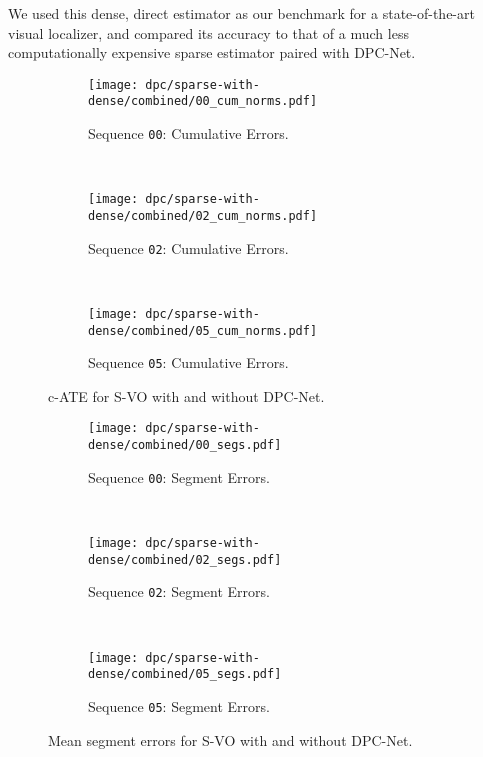 We used this dense, direct estimator as our benchmark for a state-of-the-art visual localizer, and compared its accuracy to that of a much less computationally expensive sparse estimator paired with DPC-Net.

\begin{figure}
    \centering
    \begin{subfigure}{0.8\textwidth}
	   \texttt{[image: dpc/sparse-with-dense/combined/00\_cum\_norms.pdf]}
       \label{00-pose-cum}
       \caption{Sequence \texttt{00}: Cumulative Errors.}
    \end{subfigure}
    ~
     \begin{subfigure}{0.8\textwidth}
        \texttt{[image: dpc/sparse-with-dense/combined/02\_cum\_norms.pdf]}
        \label{02-pose-cum}
        \caption{Sequence \texttt{02}: Cumulative Errors.}
     \end{subfigure}
     ~
      \begin{subfigure}{0.8\textwidth}
        \texttt{[image: dpc/sparse-with-dense/combined/05\_cum\_norms.pdf]}
        \label{05-pose-cum}
        \caption{Sequence \texttt{05}: Cumulative Errors.}
     \end{subfigure}
   \caption{c-ATE for S-VO with and without DPC-Net.}
  \label{fig:dpc-cum-errs} 
\end{figure}

\begin{figure}
    \centering
    \begin{subfigure}{0.8\textwidth}
        \texttt{[image: dpc/sparse-with-dense/combined/00\_segs.pdf]}
        \label{00-pose-segs}
        \caption{Sequence \texttt{00}: Segment Errors.}
     \end{subfigure}
     ~
     \begin{subfigure}{0.8\textwidth}
         \texttt{[image: dpc/sparse-with-dense/combined/02\_segs.pdf]}
         \label{02-pose-segs}
         \caption{Sequence \texttt{02}: Segment Errors.}
      \end{subfigure}
     ~
     \begin{subfigure}{0.8\textwidth}
         \texttt{[image: dpc/sparse-with-dense/combined/05\_segs.pdf]}
         \label{05-pose-segs}
         \caption{Sequence \texttt{05}: Segment Errors.}
      \end{subfigure}
   \caption{Mean segment errors for S-VO with and without DPC-Net.}
  \label{fig:dpc-seg-errs} 
\end{figure}

